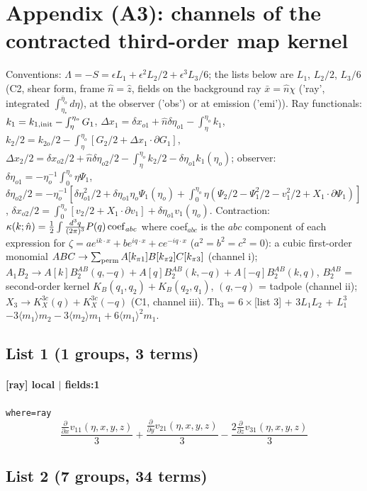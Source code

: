 \section*{Appendix (A3): channels of the contracted third-order map kernel}
Conventions: $\Lambda=-S=\epsilon L_1+\epsilon^2L_2/2+\epsilon^3L_3/6$; the lists below are $L_1$, $L_2/2$, $L_3/6$ (C2, shear form, frame
$\hat n=\hat z$, fields on the background ray $\bar x=\hat n\chi$ ('ray', integrated $\int_{\eta_*}^{\bar\eta_o}d\eta$), at the observer ('obs') or at
emission ('emi')). Ray functionals: $k_1=k_{1,\rm init}-\int_\eta^{\eta_o}G_1$, $\Delta x_1=\delta x_{o1}+\hat n\delta\eta_{o1}-\int_\eta^{\eta_o}k_1$,
$k_2/2=k_{2o}/2-\int_\eta^{\eta_o}[G_2/2+\Delta x_1\cdot\partial G_1]$, $\Delta x_2/2=\delta x_{o2}/2+\hat n\delta\eta_{o2}/2-\int_\eta^{\eta_o}k_2/2-\delta\eta_{o1}k_1(\eta_o)$;
observer: $\delta\eta_{o1}=-\eta_o^{-1}\int_0^{\eta_o}\eta\Psi_1$, $\delta\eta_{o2}/2=-\eta_o^{-1}[\delta\eta_{o1}^2/2+\delta\eta_{o1}\eta_o\Psi_1(\eta_o)+\int_0^{\eta_o}\eta(\Psi_2/2-\Psi_1^2/2-v_1^2/2+X_1\cdot\partial\Psi_1)]$,
$\delta x_{o2}/2=\int_0^{\eta_o}[v_2/2+X_1\cdot\partial v_1]+\delta\eta_{o1}v_1(\eta_o)$. Contraction: $\kappa(k;\hat n)=\tfrac12\int\frac{d^3q}{(2\pi)^3}P(q)\,{\rm coef}_{abc}$ where
coef$_{abc}$ is the $abc$ component of each expression for $\zeta=a e^{ik\cdot x}+b e^{iq\cdot x}+c e^{-iq\cdot x}$ ($a^2=b^2=c^2=0$): a cubic first-order monomial
$ABC\to\sum_{\rm perm}A[k_{\pi1}]B[k_{\pi2}]C[k_{\pi3}]$ (channel i); $A_1B_2\to A[k]B_2^{AB}(q,-q)+A[q]B_2^{AB}(k,-q)+A[-q]B_2^{AB}(k,q)$,
$B_2^{AB}$ = second-order kernel $K_B(q_1,q_2)+K_B(q_2,q_1)$, $(q,-q)$ = tadpole (channel ii); $X_3\to K^{3c}_X(q)+K^{3c}_X(-q)$ (C1, channel iii).
Th$_3$ = $6\times$[list 3] + $3L_1L_2$ + $L_1^3$ $-3\langle m_1\rangle m_2-3\langle m_2\rangle m_1+6\langle m_1\rangle^2m_1$.
\subsection*{List 1 (1 groups, 3 terms)}
\paragraph{[ray] local $|$ fields:1} \texttt{where=ray}
\begin{dmath*}\frac{\frac{\partial}{\partial x} v_{1 1}{\left(\eta,x,y,z \right)}}{3} + \frac{\frac{\partial}{\partial y} v_{2 1}{\left(\eta,x,y,z \right)}}{3} - \frac{2 \frac{\partial}{\partial z} v_{3 1}{\left(\eta,x,y,z \right)}}{3}\end{dmath*}
\subsection*{List 2 (7 groups, 34 terms)}
